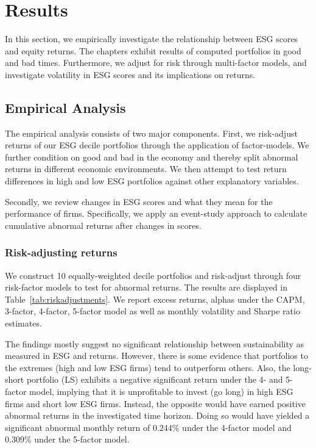\documentclass[11pt]{article}
\begin{document}



\section{Results}

In this section, we empirically investigate the relationship between ESG scores and equity returns. The chapters exhibit results of computed portfolios in good and bad times. Furthermore, we adjust for risk through multi-factor models, and investigate volatility in ESG scores and its implications on returns.

\subsection{Empirical Analysis}

The empirical analysis consists of two major components. First, we risk-adjust returns of our ESG decile portfolios through the application of factor-models. We further condition on good and bad in the economy and thereby split abnormal returns in different economic environments. We then attempt to test return differences in high and low ESG portfolios against other explanatory variables. 

Secondly, we review changes in ESG scores and what they mean for the performance of firms. Specifically, we apply an event-study approach to calculate cumulative abnormal returns after changes in scores.


\subsubsection{Risk-adjusting returns}

We construct 10 equally-weighted decile portfolios and risk-adjust through four risk-factor models to test for abnormal returns. The results are displayed in Table~\ref{tab:riskadjustments}. We report excess returns, alphas under the CAPM, 3-factor, 4-factor, 5-factor model as well as monthly volatility and Sharpe ratio estimates.

The findings mostly suggest no significant relationship between sustainability as measured in ESG and returns. However, there is some evidence that portfolios to the extremes (high and low ESG firms) tend to outperform others. Also, the long-short portfolio (LS) exhibits a negative significant return under the 4- and 5-factor model, implying that it is unprofitable to invest (go long) in high ESG firms and short low ESG firms. Instead, the opposite would have earned positive abnormal returns in the investigated time horizon. Doing so would have yielded a significant abnormal monthly return of 0.244\% under the 4-factor model and 0.309\% under the 5-factor model. 
\end{document}
